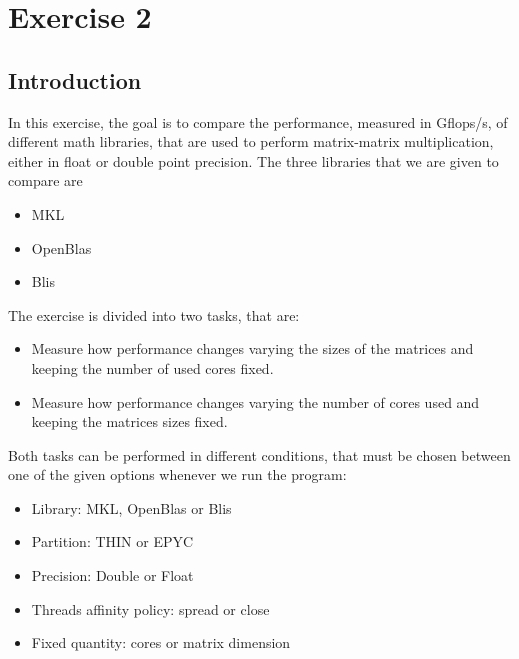 \documentclass[12pt]{article}
\begin{document}
\section{Exercise 2}

    \subsection{Introduction}

    In this exercise, the goal is to compare the performance, measured in Gflops/s, of different math libraries, that are used to perform matrix-matrix multiplication, either in float or double point precision. The three libraries that we are given to compare are
    \begin{itemize}
        \item MKL
        \item OpenBlas
        \item Blis
    \end{itemize}
    The exercise is divided into two tasks, that are:
    \begin{itemize}
        \item Measure how performance changes varying the sizes of the matrices and keeping the number of used cores fixed.
        \item Measure how performance changes varying the number of cores used and keeping the matrices sizes fixed.
    \end{itemize}

    Both tasks can be performed in different conditions, that must be chosen between one of the given options whenever we run the program:
    \begin{itemize}
        \item Library: MKL, OpenBlas or Blis
        \item Partition: THIN or EPYC
        \item Precision: Double or Float
        \item Threads affinity policy: spread or close
        \item Fixed quantity: cores or matrix dimension
    \end{itemize}
    
\end{document}
